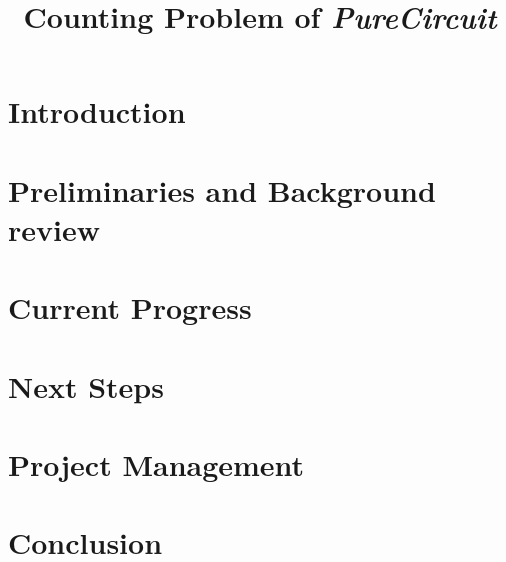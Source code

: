 \documentclass[onecolumn]{IEEEtran}
\begin{document}
\title{Counting Problem of \textit{PureCircuit}}

\author{
}

\maketitle

\begin{abstract}

\end{abstract}

\section{Introduction}


\section{Preliminaries and Background review}


\section{Current Progress}


\section{Next Steps}


% 

\section{Project Management} 


\section{Conclusion} 

    



% 
\end{document}
